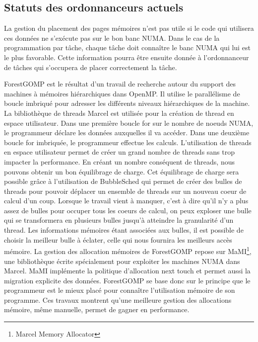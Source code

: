 \subsection{Statuts des ordonnanceurs actuels}
La gestion du placement des pages mémoires n'est pas utile si le code qui utilisera ces données ne s'exécute pas sur le bon banc NUMA.
%
Dans le cas de la programmation par tâche, chaque tâche doit connaître le banc NUMA qui lui est le plus favorable.
%
Cette information pourra être ensuite donnée à l'ordonnanceur de tâches qui s'occupera de placer correctement la tâche.




ForestGOMP\cite{Bro10Thesis} est le résultat d'un travail de recherche autour du support des machines à mémoires hiérarchiques dans OpenMP.
%
Il utilise le parallélisme de boucle imbriqué pour adresser les différents niveaux hiérarchiques de la machine.
%
La bibliothèque de threads Marcel\cite{marcel} est utilisée pour la création de thread en espace utilisateur.
%
Dans une première boucle for sur le nombre de noeuds NUMA, le programmeur déclare les données auxquelles il va accéder.
%
Dans une deuxième boucle for imbriquée, le programmeur effectue les calculs.
%
L'utilisation de threads en espace utilisateur permet de créer un grand nombre de threads sans trop impacter la performance.
%
En créant un nombre conséquent de threads, nous pouvons obtenir un bon équilibrage de charge.
%
Cet équilibrage de charge sera possible grâce à l'utilisation de BubbleSched\cite{bubblesched} qui permet de créer des bulles de threads pour pouvoir déplacer un ensemble de threads sur un nouveau coeur de calcul d'un coup.
%
Lorsque le travail vient à manquer, c'est à dire qu'il n'y a plus assez de bulles pour occuper tous les coeurs de calcul, on peux exploser une bulle qui se transformera en plusieurs bulles jusqu'à atteindre la granularité d'un thread.
%
Les informations mémoires étant associées aux bulles, il est possible de choisir la meilleur bulle à éclater, celle qui nous fournira les meilleurs accès mémoire.
%
La gestion des allocation mémoires de ForestGOMP repose sur MaMI\footnote{Marcel Memory Allocator}, une bibliothèque écrite spécialement pour exploiter les machines NUMA dans Marcel.
%
MaMI implémente la politique d'allocation next touch et permet aussi la migration explicite des données.
%
ForestGOMP se base donc sur le principe que le programmeur est le mieux placé pour connaître l'utilisation mémoire de son programme.
%
Ces travaux montrent qu'une meilleure gestion des allocations mémoire, même manuelle, permet de gagner en performance.




